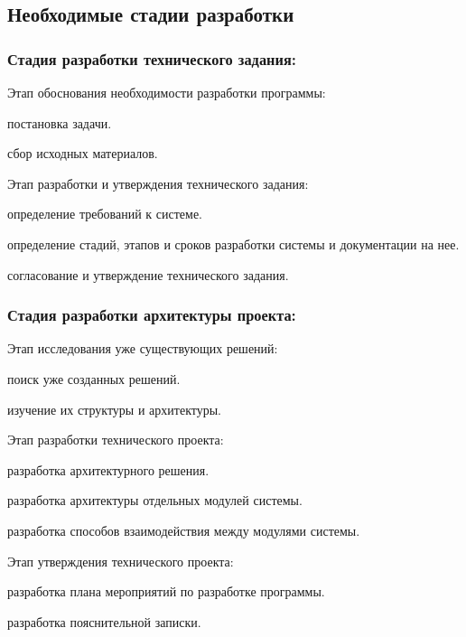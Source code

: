 
\subsection{Необходимые стадии разработки}

\subsubsection{Стадия разработки технического задания:}
\begin{my_enumerate}
\item Этап обоснования необходимости разработки программы:
    \begin{my_enumerate}
    \item постановка задачи.
    \item сбор исходных материалов.
    \end{my_enumerate}
\item Этап разработки и утверждения технического задания:
    \begin{my_enumerate}
    \item определение требований к системе.
    \item определение стадий, этапов и сроков разработки системы и документации на нее.
    \item согласование и утверждение технического задания.
    \end{my_enumerate}
\end{my_enumerate}

\subsubsection{Стадия разработки архитектуры проекта:}
\begin{my_enumerate}
\item Этап исследования уже существующих решений:
    \begin{my_enumerate}
    \item поиск уже созданных решений.
    \item изучение их структуры и архитектуры.
    \end{my_enumerate}
\item Этап разработки технического проекта:
    \begin{my_enumerate}
    \item разработка архитектурного решения.
    \item разработка архитектуры отдельных модулей системы.
    \item разработка способов взаимодействия между модулями системы.
    \end{my_enumerate}
\item Этап утверждения технического проекта:
    \begin{my_enumerate}
    \item разработка плана мероприятий по разработке программы.
    \item разработка пояснительной записки.
    \end{my_enumerate}
\end{my_enumerate}


